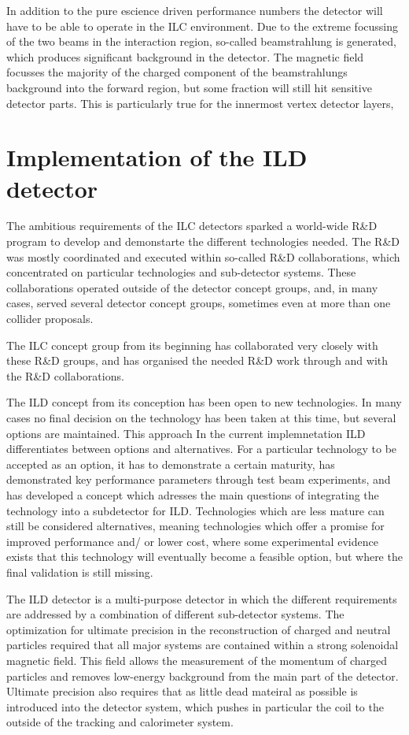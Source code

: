 \documentclass[%
 amsmath,amssymb,
 aps,
]{revtex4-1}
\begin{document}
In addition to the pure escience driven performance numbers the detector will have to be able to operate in the ILC environment. Due to the extreme focussing of the two beams in the interaction region, so-called beamstrahlung is generated, which produces significant background in the detector. The magnetic field focusses the majority of the charged component of the beamstrahlungs background into the forward region, but some fraction will still hit sensitive detector parts. This is particularly true for the innermost vertex detector layers, 


\section{Implementation of the ILD detector}
The ambitious requirements of the ILC detectors sparked a world-wide R\&D program to develop and demonstarte the different technologies needed. The R\&D was mostly coordinated and executed within so-called R\&D collaborations, which concentrated on particular technologies and sub-detector systems. These collaborations operated outside of the detector concept groups, and, in many cases, served several detector concept groups, sometimes even at more than one collider proposals. 

The ILC concept group from its beginning has collaborated very closely with these R\&D groups, and has organised the needed R\&D work through and with the R\&D collaborations. 

The ILD concept from its conception has been open to new technologies. In many cases no final decision on the technology has been taken at this time, but several options are maintained. This approach In the current implemnetation ILD differentiates between options and alternatives. For a particular technology to be accepted as an option, it has to demonstrate a certain maturity, has demonstrated key performance parameters through test beam experiments, and has developed a concept which adresses the main questions of integrating the technology into a subdetector for ILD. Technologies which are less mature can still be considered alternatives, meaning technologies which offer a promise for improved performance and/ or lower cost, where some experimental evidence exists that this technology will eventually become a feasible option, but where the final validation is still missing. 

The ILD detector is a multi-purpose detector in which the different requirements are addressed by a combination of different sub-detector systems. The optimization for ultimate precision in the reconstruction of charged and neutral particles required that all major systems are contained within a strong solenoidal magnetic field. This field allows the measurement of the momentum of charged particles and removes low-energy background from the main part of the detector. Ultimate precision also requires that as little dead mateiral as possible is introduced into the detector system, which pushes in particular the coil to the outside of the tracking and calorimeter system. 
\end{document}
